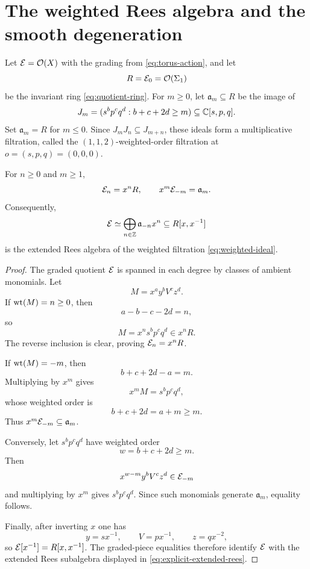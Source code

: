\section{The weighted Rees algebra and the smooth degeneration}\label{sec:rees-structure}

\begin{definition}\label{def:explicit-weighted-filtration}
Let $\mathcal E=\mathcal O(X)$ with the grading from \eqref{eq:torus-action}, and let
\[
  R=\mathcal E_0=\mathcal O(\Sigma_1)
\]
be the invariant ring \eqref{eq:quotient-ring}.  For $m\geq0$, let $\mathfrak a_m\subseteq R$ be the image of
\begin{equation}\label{eq:weighted-ideal}
  J_m=(s^bp^cq^d:b+c+2d\geq m)
  \subseteq\mathbb C[s,p,q].
\end{equation}
Set $\mathfrak a_m=R$ for $m\leq0$.  Since $J_mJ_n\subseteq J_{m+n}$, these ideals form a multiplicative filtration, called the $(1,1,2)$-weighted-order filtration at $o=(s,p,q)=(0,0,0)$.
\end{definition}

\begin{theorem}\label{thm:explicit-rees}
For $n\geq0$ and $m\geq1$,
\[
  \mathcal E_n=x^nR,
  \qquad
  x^m\mathcal E_{-m}=\mathfrak a_m.
\]
Consequently,
\begin{equation}\label{eq:explicit-extended-rees}
  \mathcal E\simeq\bigoplus_{n\in\mathbb Z}\mathfrak a_{-n}x^n
  \subseteq R[x,x^{-1}]
\end{equation}
is the extended Rees algebra of the weighted filtration \eqref{eq:weighted-ideal}.
\end{theorem}

\begin{proof}
The graded quotient $\mathcal E$ is spanned in each degree by classes of ambient monomials.  Let
\[
  M=x^ay^bV^cz^d.
\]
If $\operatorname{wt}(M)=n\geq0$, then
\[
  a-b-c-2d=n,
\]
so
\[
  M=x^n s^bp^cq^d\in x^nR.
\]
The reverse inclusion is clear, proving $\mathcal E_n=x^nR$.

If $\operatorname{wt}(M)=-m$, then
\[
  b+c+2d-a=m.
\]
Multiplying by $x^m$ gives
\[
  x^mM=s^bp^cq^d,
\]
whose weighted order is
\[
  b+c+2d=a+m\geq m.
\]
Thus $x^m\mathcal E_{-m}\subseteq\mathfrak a_m$.

Conversely, let $s^bp^cq^d$ have weighted order
\[
  w=b+c+2d\geq m.
\]
Then
\[
  x^{w-m}y^bV^cz^d\in \mathcal E_{-m}
\]
and multiplying by $x^m$ gives $s^bp^cq^d$.  Since such monomials generate $\mathfrak a_m$, equality follows.

Finally, after inverting $x$ one has
\[
  y=sx^{-1},\qquad V=px^{-1},\qquad z=qx^{-2},
\]
so $\mathcal E[x^{-1}]=R[x,x^{-1}]$.  The graded-piece equalities therefore identify $\mathcal E$ with the extended Rees subalgebra displayed in \eqref{eq:explicit-extended-rees}.
\end{proof}

